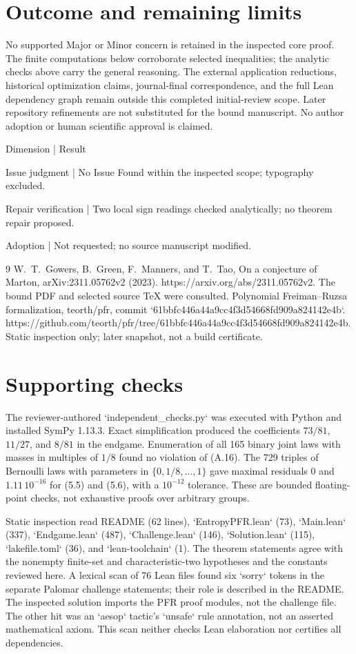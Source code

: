 \documentclass[10pt]{article}
\begin{document}
\section*{Outcome and remaining limits}
No supported Major or Minor concern is retained in the inspected core proof. The finite computations below corroborate selected inequalities; the analytic checks above carry the general reasoning. The external application reductions, historical optimization claims, journal-final correspondence, and the full Lean dependency graph remain outside this completed initial-review scope. Later repository refinements are not substituted for the bound manuscript. No author adoption or human scientific approval is claimed.\par
Dimension | Result\par
Issue judgment | No Issue Found within the inspected scope; typography excluded.\par
Repair verification | Two local sign readings checked analytically; no theorem repair proposed.\par
Adoption | Not requested; no source manuscript modified.\par
9 W. T. Gowers, B. Green, F. Manners, and T. Tao, On a conjecture of Marton, arXiv:2311.05762v2 (2023). https://arxiv.org/abs/2311.05762v2. The bound PDF and selected source TeX were consulted. Polynomial Freiman–Ruzsa formalization, teorth/pfr, commit `61bbfc446a44a9cc4f3d54668fd909a824142e4b`. https://github.com/teorth/pfr/tree/61bbfc446a44a9cc4f3d54668fd909a824142e4b. Static inspection only; later snapshot, not a build certificate.\par
\section*{Supporting checks}
The reviewer-authored `independent\_checks.py` was executed with Python and installed SymPy 1.13.3. Exact simplification produced the coefficients \(73/81\), \(11/27\), and \(8/81\) in the endgame. Enumeration of all 165 binary joint laws with masses in multiples of \(1/8\) found no violation of (A.16). The 729 triples of Bernoulli laws with parameters in \(\{0,1/8,\ldots,1\}\) gave maximal residuals \(0\) and \(1.11\,10^{-16}\) for (5.5) and (5.6), with a \(10^{-12}\) tolerance. These are bounded floating-point checks, not exhaustive proofs over arbitrary groups.\par
Static inspection read README (62 lines), `EntropyPFR.lean` (73), `Main.lean` (337), `Endgame.lean` (487), `Challenge.lean` (146), `Solution.lean` (115), `lakefile.toml` (36), and `lean-toolchain` (1). The theorem statements agree with the nonempty finite-set and characteristic-two hypotheses and the constants reviewed here. A lexical scan of 76 Lean files found six `sorry` tokens in the separate Palomar challenge statements; their role is described in the README. The inspected solution imports the PFR proof modules, not the challenge file. The other hit was an `aesop` tactic’s `unsafe` rule annotation, not an asserted mathematical axiom. This scan neither checks Lean elaboration nor certifies all dependencies.\par
\end{document}
